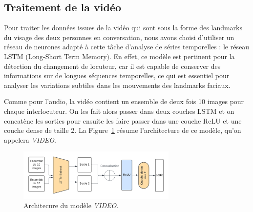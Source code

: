 \subsection{Traitement de la vidéo}

Pour traiter les données issues de la vidéo qui sont sous la forme des landmarks du visage des deux personnes en conversation,
nous avons choisi d'utiliser un réseau de neurones adapté à cette tâche d'analyse de séries temporelles : le réseau LSTM (Long-Short
Term Memory). En effet, ce modèle est pertinent pour la détection du changement de locuteur, car il est capable de conserver des
informations sur de longues séquences temporelles, ce qui est essentiel pour analyser les variations subtiles dans les mouvements
des landmarks faciaux. 

Comme pour l'audio, la vidéo contient un ensemble de deux fois 10 images pour chaque interlocuteur. On les fait alors passer
dans deux couches LSTM et on concatène les sorties pour ensuite les faire passer dans une couche ReLU et une couche dense de taille 2.
La Figure~\ref{fig: model_video} résume l'architecture de ce modèle, qu'on appelera \textit{VIDEO}.

\begin{figure}[H]
    \centering
    \includegraphics[width=0.7\textwidth]{image_model/model_video.png}
    \caption{Architecure du modèle \textit{VIDEO}.}
    \label{fig: model_video}
\end{figure}